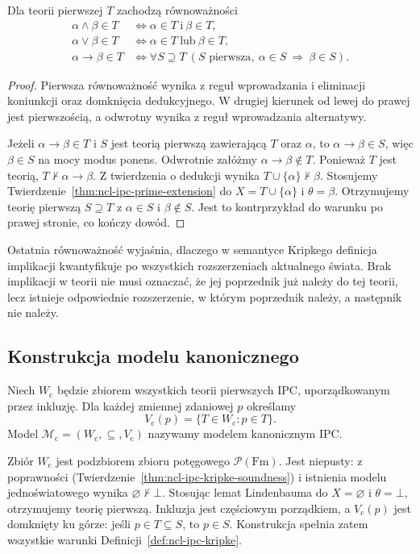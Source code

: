 \begin{lemat}
\label{lem:ncl-ipc-prime-properties}
Dla teorii pierwszej $T$ zachodzą równoważności
\[
\begin{aligned}
 \alpha\wedge\beta\in T
 &\iff \alpha\in T\ \text{i}\ \beta\in T,\\
 \alpha\vee\beta\in T
 &\iff \alpha\in T\ \text{lub}\ \beta\in T,\\
 \alpha\to\beta\in T
 &\iff \forall S\supseteq T\
      (S\text{ pierwsza},\ \alpha\in S
        \ \Longrightarrow\ \beta\in S).
\end{aligned}
\]
\end{lemat}
\begin{proof}
Pierwsza równoważność wynika z reguł wprowadzania
i eliminacji koniunkcji oraz domknięcia dedukcyjnego.
W drugiej kierunek od lewej do prawej jest
pierwszością, a odwrotny wynika z reguł
wprowadzania alternatywy.

Jeżeli $\alpha\to\beta\in T$ i $S$ jest teorią
pierwszą zawierającą $T$ oraz $\alpha$, to
$\alpha\to\beta\in S$, więc $\beta\in S$
na mocy modus ponens.
Odwrotnie załóżmy $\alpha\to\beta\notin T$.
Ponieważ $T$ jest teorią,
$T\nvdash\alpha\to\beta$. Z twierdzenia o dedukcji
wynika
$T\cup\{\alpha\}\nvdash\beta$.
Stosujemy Twierdzenie~\ref{thm:ncl-ipc-prime-extension}
do $X=T\cup\{\alpha\}$ i $\theta=\beta$.
Otrzymujemy teorię pierwszą $S\supseteq T$
z $\alpha\in S$ i $\beta\notin S$.
Jest to kontrprzykład do warunku po prawej stronie,
co kończy dowód.
\end{proof}
Ostatnia równoważność wyjaśnia, dlaczego w semantyce
Kripkego definicja implikacji kwantyfikuje po
wszystkich rozszerzeniach aktualnego świata.
Brak implikacji w teorii nie musi oznaczać, że
jej poprzednik już należy do tej teorii, lecz
istnieje odpowiednie rozszerzenie, w którym
poprzednik należy, a następnik nie należy.

\subsection{Konstrukcja modelu kanonicznego}

\begin{definicja}
\label{def:ncl-ipc-canonical-model}
Niech $W_{\mathrm c}$ będzie zbiorem wszystkich teorii
pierwszych IPC, uporządkowanym przez inkluzję.
Dla każdej zmiennej zdaniowej $p$ określamy
\[
 V_{\mathrm c}(p)=\{T\in W_{\mathrm c}:p\in T\}.
\]
Model $\mathcal M_{\mathrm c}=
(W_{\mathrm c},\subseteq,V_{\mathrm c})$
nazywamy modelem kanonicznym IPC.
\end{definicja}
Zbiór $W_{\mathrm c}$ jest podzbiorem
zbioru potęgowego $\mathcal P(\mathrm{Fm})$. Jest niepusty: z poprawności
(Twierdzenie~\ref{thm:ncl-ipc-kripke-soundness})
i istnienia modelu jednoświatowego wynika
$\varnothing\nvdash\bot$. Stosując lemat Lindenbauma
do $X=\varnothing$ i $\theta=\bot$, otrzymujemy
teorię pierwszą. Inkluzja jest częściowym porządkiem,
a $V_{\mathrm c}(p)$ jest domknięty ku górze:
jeśli $p\in T\subseteq S$, to $p\in S$.
Konstrukcja spełnia zatem wszystkie warunki
Definicji~\ref{def:ncl-ipc-kripke}.

